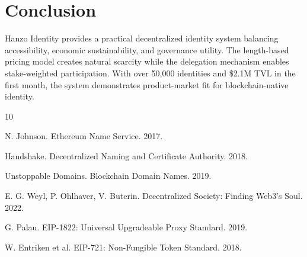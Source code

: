 \section{Conclusion}


Hanzo Identity provides a practical decentralized identity system balancing accessibility, economic sustainability, and governance utility. The length-based pricing model creates natural scarcity while the delegation mechanism enables stake-weighted participation. With over 50,000 identities and \$2.1M TVL in the first month, the system demonstrates product-market fit for blockchain-native identity.


\begin{thebibliography}{10}

N. Johnson. Ethereum Name Service. 2017.

Handshake. Decentralized Naming and Certificate Authority. 2018.

Unstoppable Domains. Blockchain Domain Names. 2019.

E. G. Weyl, P. Ohlhaver, V. Buterin. Decentralized Society: Finding Web3's Soul. 2022.

G. Palau. EIP-1822: Universal Upgradeable Proxy Standard. 2019.

W. Entriken et al. EIP-721: Non-Fungible Token Standard. 2018.

\end{thebibliography}


